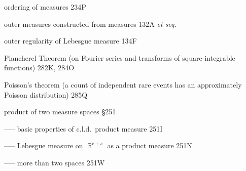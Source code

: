 













\indexmedskip















ordering of measures 234P




outer measures constructed from measures 132A {\it et seq.}

outer regularity of Lebesgue measure 134F

\indexmedskip

















Plancherel Theorem (on Fourier series and transforms of
square-integrable functions) 282K, 284O














Poisson's theorem (a count of independent rare events has an
approximately Poisson distribution) 285Q














product of two measure spaces \S251

----- basic properties of c.l.d.\ product measure 251I

----- Lebesgue measure on $\BbbR^{r+s}$ as a product measure 251N


----- more than two spaces 251W

